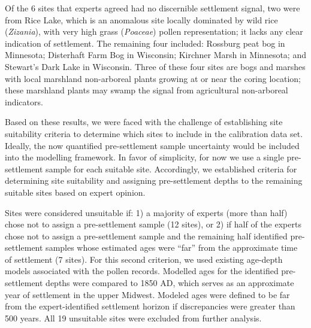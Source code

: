 \documentclass[12pt]{article}
\begin{document}
Of the 6 sites that experts agreed had no discernible settlement
signal, two were from Rice Lake, which is an anomalous site locally
dominated by wild rice (\textit{Zizania}), with very high grass
(\textit{Poaceae}) pollen representation; it lacks any clear
indication of settlement. The remaining four included: Rossburg peat
bog in Minnesota; Disterhaft Farm Bog in Wisconsin; Kirchner Marsh in
Minnesota; and Stewart’s Dark Lake in Wisconsin. Three of these four
sites are bogs and marshes with local marshland non-arboreal plants
growing at or near the coring location; these marshland plants may
swamp the signal from agricultural non-arboreal indicators.

Based on these results, we were faced with the challenge of
establishing site suitability criteria to determine which sites to
include in the calibration data set. Ideally, the now quantified
pre-settlement sample uncertainty would be included into the modelling
framework. In favor of simplicity, for now we use a single
pre-settlement sample for each suitable site. Accordingly, we
established criteria for determining site suitability and assigning
pre-settlement depths to the remaining suitable sites based on expert
opinion.



Sites were considered unsuitable if: 1) a majority of experts (more
than half) chose not to assign a pre-settlement sample (12 sites), or
2) if half of the experts chose not to assign a pre-settlement sample
and the remaining half identified pre-settlement samples whose
estimated ages were “far” from the approximate time of settlement (7
sites). For this second criterion, we used existing age-depth models
associated with the pollen records. Modelled ages for the identified
pre-settlement depths were compared to 1850 AD, which serves as an
approximate year of settlement in the upper Midwest.  Modeled ages
were defined to be far from the expert-identified settlement horizon
if discrepancies were greater than 500 years. All 19 unsuitable sites
were excluded from further analysis.
\end{document}
